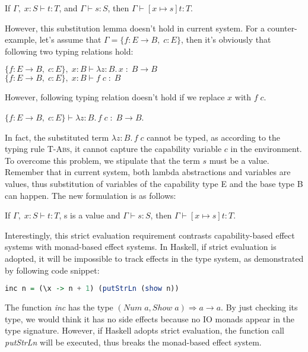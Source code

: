 \begin{lemma}
If $\Gamma,\; x:S \vdash t : T$, and $\Gamma \vdash s : S$, then $\Gamma
\vdash [x \mapsto s]t : T$.
\end{lemma}

However, this substitution lemma doesn't hold in current system. For a
counter-example, let's assume that $\Gamma = \{f: E \to B,\; c:E\}$,
then it's obviously that following two typing relations hold:

$\{f: E \to B,\; c:E\},\; x:B \vdash \lambda z:B.\,x \; : \; B \to
  B$ \\
$\{f: E \to B,\; c:E\},\; x:B \vdash f \; c \; : \; B$

However, following typing relation doesn't hold if we replace $x$ with
$f \; c$.

$\{f: E \to B,\; c:E\} \vdash \lambda z:B.\,f \; c \; : \; B \to B$.

In fact, the substituted term $\lambda z:B.\,f \; c$ cannot be typed,
as according to the typing rule \textsc{T-Abs}, it cannot capture the
capability variable $c$ in the environment. To overcome this problem,
we stipulate that the term $s$ must be a value. Remember that in
current system, both lambda abstractions and variables are values,
thus substitution of variables of the capability type E and the base
type B can happen. The new formulation is as follows:

\begin{lemma}
  If $\Gamma,\; x:S \vdash t : T$, s is a value and
  $\Gamma \vdash s : S$, then $\Gamma \vdash [x \mapsto s]t : T$.
\end{lemma}

Interestingly, this strict evaluation requirement contrasts
capability-based effect systems with monad-based effect systems. In
Haskell, if strict evaluation is adopted, it will be impossible to
track effects in the type system, as demonstrated by following code
snippet:

\begin{lstlisting}[language=Haskell]
  inc n = (\x -> n + 1) (putStrLn (show n))
\end{lstlisting}

The function \emph{inc} has the type
$(Num\;a, Show\;a) \Rightarrow a \to a$. By just checking its type, we
would think it has no side effects because no IO monads appear in the
type signature. However, if Haskell adopts strict evaluation, the
function call \emph{putStrLn} will be executed, thus breaks the
monad-based effect system.

